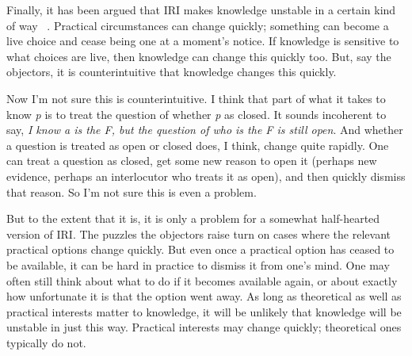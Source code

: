 Finally, it has been argued that IRI makes knowledge unstable in a certain kind of way ~\citep{Lutz2014, Anderson2015}. Practical circumstances can change quickly; something can become a live choice and cease being one at a moment's notice. If knowledge is sensitive to what choices are live, then knowledge can change this quickly too. But, say the objectors, it is counterintuitive that knowledge changes this quickly.

Now I'm not sure this is counterintuitive. I think that part of what it takes to know \emph{p} is to treat the question of whether \emph{p} as closed. It sounds incoherent to say, \emph{I know a is the F, but the question of who is the F is still open}. And whether a question is treated as open or closed does, I think, change quite rapidly. One can treat a question as closed, get some new reason to open it (perhaps new evidence, perhaps an interlocutor who treats it as open), and then quickly dismiss that reason. So I'm not sure this is even a problem.

But to the extent that it is, it is only a problem for a somewhat half-hearted version of IRI. The puzzles the objectors raise turn on cases where the relevant practical options change quickly. But even once a practical option has ceased to be available, it can be hard in practice to dismiss it from one's mind. One may often still think about what to do if it becomes available again, or about exactly how unfortunate it is that the option went away. As long as theoretical as well as practical interests matter to knowledge, it will be unlikely that knowledge will be unstable in just this way. Practical interests may change quickly; theoretical ones typically do not.



